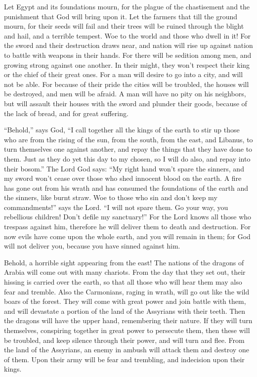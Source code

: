  Let Egypt and its foundations mourn, for the plague of the
chastisement and the punishment that God will bring upon it.
 Let the farmers that till the ground mourn, for their
seeds will fail and their trees will be ruined through the blight and
hail, and a terrible tempest.  Woe to the world and those
who dwell in it!  For the sword and their destruction draws
near, and nation will rise up against nation to battle with weapons in
their hands.  For there will be sedition among men, and
growing strong against one another. In their might, they won't respect
their king or the chief of their great ones.  For a man
will desire to go into a city, and will not be able.  For
because of their pride the cities will be troubled, the houses will be
destroyed, and men will be afraid.  A man will have no pity
on his neighbors, but will assault their houses with the sword and
plunder their goods, because of the lack of bread, and for great
suffering.

 ``Behold,'' says God, ``I call together all the kings of
the earth to stir up those who are from the rising of the sun, from the
south, from the east, and Libanus, to turn themselves one against
another, and repay the things that they have done to them. 
Just as they do yet this day to my chosen, so I will do also, and repay
into their bosom.'' The Lord God says:  ``My right hand
won't spare the sinners, and my sword won't cease over those who shed
innocent blood on the earth.  A fire has gone out from his
wrath and has consumed the foundations of the earth and the sinners,
like burnt straw.  Woe to those who sin and don't keep my
commandments!'' says the Lord.  ``I will not spare them. Go
your way, you rebellious children! Don't defile my sanctuary!''
 For the Lord knows all those who trespass against him,
therefore he will deliver them to death and destruction. 
For now evils have come upon the whole earth, and you will remain in
them; for God will not deliver you, because you have sinned against him.

 Behold, a horrible sight appearing from the east!
 The nations of the dragons of Arabia will come out with
many chariots. From the day that they set out, their hissing is carried
over the earth, so that all those who will hear them may also fear and
tremble.  Also the Carmonians, raging in wrath, will go out
like the wild boars of the forest. They will come with great power and
join battle with them, and will devastate a portion of the land of the
Assyrians with their teeth.  Then the dragons will have the
upper hand, remembering their nature. If they will turn themselves,
conspiring together in great power to persecute them,  then
these will be troubled, and keep silence through their power, and will
turn and flee.  From the land of the Assyrians, an enemy in
ambush will attack them and destroy one of them. Upon their army will be
fear and trembling, and indecision upon their kings.

